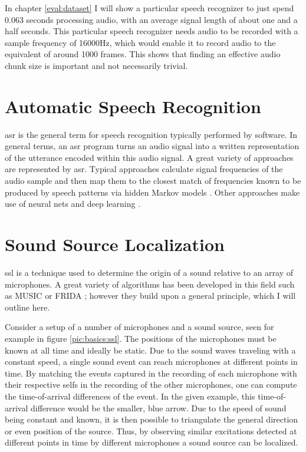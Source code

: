In chapter \ref{eval:dataset} I will show a particular speech recognizer to just spend 0.063 seconds processing audio, with an average signal length of about one and a half seconds.
This particular speech recognizer needs audio to be recorded with a sample frequency of 16000Hz, which would enable it to record audio to the equivalent
of around 1000 frames. %
This shows that finding an effective audio chunk size is important and not necessarily trivial.

\section{Automatic Speech Recognition}
\gls{asr} is the general term for speech recognition typically performed by software.
In general terms, an \gls{asr} program turns an audio signal into a written representation of the utterance encoded within this audio signal.
A great variety of approaches are represented by \gls{asr}.
Typical approaches calculate signal frequencies of the audio sample and then map them to the closest match of frequencies known to be produced by speech patterns via hidden Markov models \cite{266524,GALES199875}.
Other approaches make use of neural nets and deep learning \cite{6639344}.

\section{Sound Source Localization}
\label{basics:ssl}
\gls{ssl} is a technique used to determine the origin of a sound relative to an array of microphones.
A great variety of algorithms has been developed in this field such as MUSIC \cite{music} or FRIDA \cite{7952744}; however they build upon a general principle, which I will outline here.

Consider a setup of a number of microphones and a sound source, seen for example in figure \ref{pic:basics:ssl}.
The positions of the microphones must be known at all time and ideally be static.
Due to the sound waves traveling with a constant speed, a single sound event can reach microphones at different points in time.
By matching the events captured in the recording of each microphone with their respective selfs in the recording of the other microphones, one can compute the time-of-arrival differences of the event.
In the given example, this time-of-arrival difference would be the smaller, blue arrow.
Due to the speed of sound being constant and known, it is then possible to triangulate the general direction or even position of the source.
Thus, by observing similar excitations detected at different points in time by different microphones a sound source can be localized.

